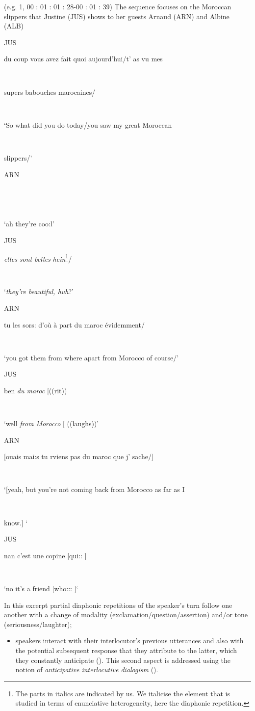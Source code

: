 \documentclass[output=paper]{langscibook}
\begin{document}
\ea \label{ex:8:1}
{(e.g. 1, 00 : 01 : 01 : 28-00 : 01 : 39) The sequence focuses on the Moroccan slippers that Justine (JUS) shows to her guests Arnaud (ARN) and Albine (ALB)}

\upshape\ttfamily
\parbox{8mm}{JUS}du coup vous avez fait quoi aujourd'hui/t' as vu mes \\
\parbox{8mm}{~}supers babouches marocaines/\\
\parbox{8mm}{~}‘So what did you do today/you saw my great Moroccan\\ 
\parbox{8mm}{~} slippers/’\medskip

\parbox{8mm}{ARN}\upshape{}\\
\parbox{8mm}{~}{‘ah they're coo:l’}\medskip

\parbox{8mm}{JUS} \textit{elles sont belles} \textsl{hein}\footnote{{ The parts in italics are indicated by us. We italicise the element that is studied in terms of enunciative heterogeneity, here the diaphonic repetition.}}{/}\\
\parbox{8mm}{~}{‘\textsl{they're beautiful, huh}?’}\medskip

\parbox{8mm}{ARN}{tu les sors: d'où à part du maroc évidemment/}\\
\parbox{8mm}{~}{‘you got them from where apart from Morocco of course/’}\medskip

\parbox{8mm}{JUS}{ben \textsl{du maroc}   [((rit))}\\
\parbox{8mm}{~}{‘well \textsl{from Morocco} [  ((laughs))}’\largerpage[-1]\pagebreak

\parbox{8mm}{ARN}{[ouais mai:s tu r{\textasciigrave}viens pas du maroc que j' sache/]}\\
\parbox{8mm}{~}{‘[yeah, but you're not coming back from Morocco as far as I 
\parbox{8mm}{~}know.] ‘}\medskip

\parbox{8mm}{JUS}{nan c'est une copine [qui::  ]} \\
\parbox{8mm}{~}{‘no it’s a friend [who::: ]‘}\medskip

\z 

In this excerpt partial diaphonic repetitions of the speaker's turn follow one another with a change of modality (exclamation\slash question\slash assertion) and/or tone (seriousness\slash laughter);


\begin{itemize}
\item speakers interact with their interlocutor’s previous utterances and also with the potential subsequent response that they attribute to the latter, which they constantly anticipate (\citealt[303]{Bakhtine1984}). This second aspect is addressed using the notion of {\textit{anticipative interlocutive dialogism} (\citealt{BresEtAl2016})}{.} 
\end{itemize}
 
\end{document}
